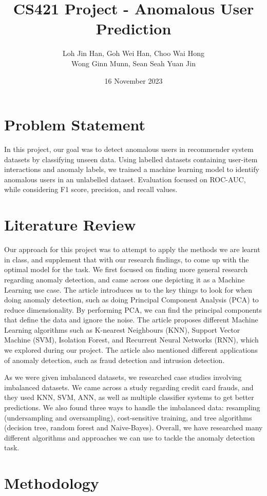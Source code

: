 \documentclass[12pt]{article}
\title{CS421 Project - Anomalous User Prediction}
\author{Loh Jin Han, Goh Wei Han, Choo Wai Hong\\Wong Ginn Munn, Sean Seah Yuan Jin}
\date{16 November 2023}
\begin{document}
\maketitle
\tableofcontents
\pagebreak
\section{Problem Statement}
In this project, our goal was to detect anomalous users in recommender system datasets by classifying unseen data. Using labelled datasets containing user-item interactions and anomaly labels, we trained a machine learning model to identify anomalous users in an unlabelled dataset. Evaluation focused on ROC-AUC, while considering F1 score, precision, and recall values.

\section{Literature Review}
Our approach for this project was to attempt to apply the methods we are learnt in class, and supplement that with our research findings, to come up with the optimal model for the task. We first focused on finding more general research regarding anomaly detection, and came across one depicting it as a Machine Learning use case. \cite{kuangHaoAnomalyDetection} The article introduces us to the key things to look for when doing anomaly detection, such as doing Principal Component Analysis (PCA) to reduce dimensionality. By performing PCA, we can find the principal components that define the data and ignore the noise. The article proposes different Machine Learning algorithms such as K-nearest Neighbours (KNN), Support Vector Machine (SVM), Isolation Forest, and Recurrent Neural Networks (RNN), which we explored during our project. The article also mentioned different applications of anomaly detection, such as fraud detection and intrusion detection.

As we were given imbalanced datasets, we researched case studies involving imbalanced datasets. We came across a study regarding credit card frauds, and they used KNN, SVM, ANN, as well as multiple classifier systems to get better predictions. \cite{8985298} We also found three ways to handle the imbalanced data: resampling (undersampling and oversampling), cost-sensitive training, and tree algorithms (decision tree, random forest and Naive-Bayes). \cite{Mînăstireanu_Meşniţă_2020} Overall, we have researched many different algorithms and approaches we can use to tackle the anomaly detection task.
\section{Methodology}
\end{document}
